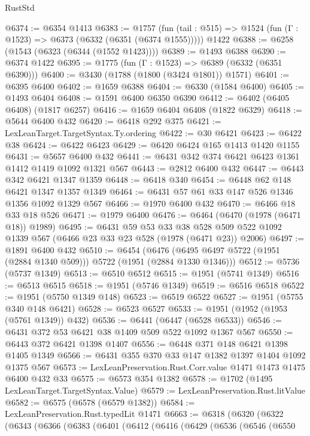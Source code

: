 \begin{lexlean}{RustStd}
\begin{coremodule}
@6374 := @6354 @1413
@6383 := @1757
    (fun (tail : @515) => @1524 (fun (Γ : @1523) => @6373 (@6332 (@6351 (@6374 @1555)))))
    @1422
@6388 := @6258 (@1543 (@6323 (@6344 (@1552 @1423))))
@6389 := @1493 @6388
@6390 := @6374 @1422
@6395 := @1775 (fun (Γ : @1523) => @6389 (@6332 (@6351 @6390)))
@6400 := @3430 (@1788 (@1800 (@3424 @1801)) @1571)
@6401 := @6395 @6400
@6402 := @1659 @6388
@6404 := @6330 (@1584 @6400)
@6405 := @1493 @6404
@6408 := @1591 @6400 @6350 @6390
@6412 := @6402 (@6405 @6408) (@1817 @6257)
@6416 := @1659 @6404 @6408 (@1822 @6329)
@6418 := @5644 @6400 @432
@6420 := @6418 @292 @375
@6421 := LexLeanTarget.TargetSyntax.Ty.ordering
@6422 := @30 @6421
@6423 := @6422 @38
@6424 := @6422 @6423
@6429 := @6420 @6424 @165 @1413 @1420 @1155
@6431 := @5657 @6400 @432
@6441 := @6431 @342 @374 @6421 @6423 @1361 @1412 @1419 @1092 @1321 @567
@6443 := @2812 @6400 @432
@6447 := @6443 @342 @6421 @1347 @1359
@6448 := @6418 @340
@6454 := @6448 @62 @148 @6421 @1347 @1357 @1349
@6464 := @6431 @57 @61 @33 @147 @526 @1346 @1356 @1092 @1329 @567
@6466 := @1970 @6400 @432
@6470 := @6466 @18 @33 @18 @526
@6471 := @1979 @6400
@6476 := @6464 (@6470 (@1978 (@6471 @18)) @1989)
@6495 := @6431
    @59
    @53
    @33
    @38
    @528
    @509
    @522
    @1092
    @1339
    @567
    (@6466 @23 @33 @23 @528 (@1978 (@6471 @23)) @2006)
@6497 := @1891 @6400 @432
@6510 := @6454
    (@6476 (@6495 @6497 @5722 (@1951 (@2884 @1340 @509))) @5722 (@1951 (@2884 @1330 @1346)))
@6512 := @5736 (@5737 @1349)
@6513 := @6510 @6512
@6515 := @1951 (@5741 @1349)
@6516 := @6513 @6515
@6518 := @1951 (@5746 @1349)
@6519 := @6516 @6518
@6522 := @1951 (@5750 @1349 @148)
@6523 := @6519 @6522
@6527 := @1951 (@5755 @340 @148 @6421)
@6528 := @6523 @6527
@6533 := @1951 (@1952 (@1953 (@5761 @1349)) @432)
@6536 := @6441 (@6447 (@6528 @6533))
@6546 := @6431 @372 @53 @6421 @38 @1409 @509 @522 @1092 @1367 @567
@6550 := @6443 @372 @6421 @1398 @1407
@6556 := @6448 @371 @148 @6421 @1398 @1405 @1349
@6566 := @6431 @355 @370 @33 @147 @1382 @1397 @1404 @1092 @1375 @567
@6573 := LexLeanPreservation.Rust.Corr.value @1471 @1473 @1475 @6400 @432 @33
@6575 := @6573 @354 @1382
@6578 := @1702 (@1495 LexLeanTarget.TargetSyntax.Value)
@6579 := LexLeanPreservation.Rust.litValue
@6582 := @6575 (@6578 (@6579 @1382))
@6584 := LexLeanPreservation.Rust.typedLit @1471
@6663 := @6318
    (@6320
      (@6322
        (@6343
          (@6366
            (@6383
              (@6401
                (@6412
                  (@6416
                    (@6429
                      (@6536
                        (@6546
                          (@6550

\end{coremodule}
\end{lexlean}
